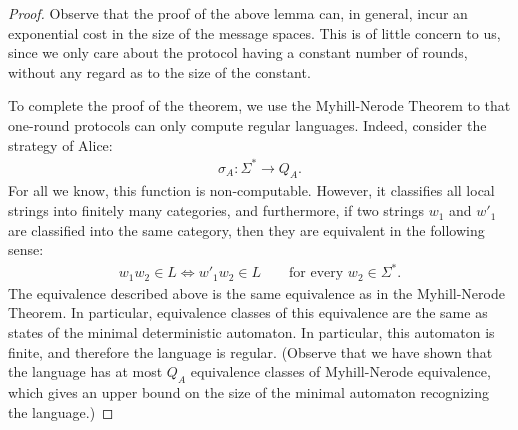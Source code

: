 \begin{proof}
  Observe that the proof of the above lemma can, in general, incur an exponential cost in the size of the message spaces. This is of little concern to us, since we only care about the protocol having a constant number of rounds, without  any regard as to the size of the constant. 

  To complete the proof of the theorem, we use the  Myhill-Nerode Theorem to that one-round protocols can only compute regular languages.  Indeed, consider the strategy of  Alice: 
  \begin{align*}
  \sigma_A : \Sigma^* \to Q_A.
  \end{align*}
  For all we know, this function is non-computable. However, it classifies all local strings into finitely many categories, and furthermore, if two strings $w_1$ and $w'_1$ are classified into the same category, then they are equivalent in the following sense: 
  \begin{align*}
  w_1 w_2 \in L \Leftrightarrow w'_1 w_2 \in L 
  \qquad \text{for every $w_2 \in \Sigma^*$.}
  \end{align*}
  The equivalence described above is the same equivalence as in the Myhill-Nerode Theorem. In particular, equivalence classes of this equivalence are the same as states of the minimal deterministic automaton. In particular, this automaton is finite, and therefore the language is regular.  (Observe that we have shown that the language has at most $Q_A$ equivalence classes of Myhill-Nerode equivalence, which gives an upper bound on the size of the minimal automaton recognizing the language.)
\end{proof}

